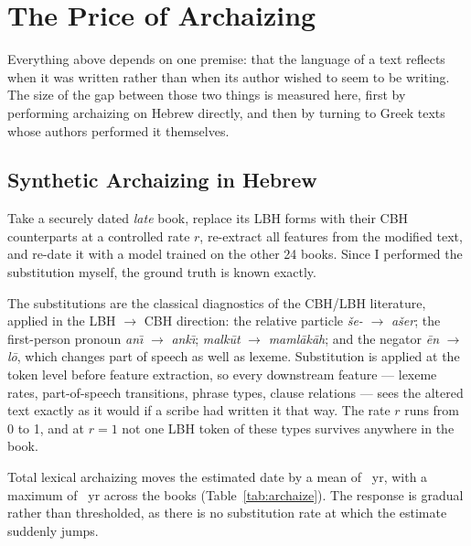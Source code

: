 \documentclass[10pt,letterpaper]{article}
\newcommand{\cbh}{CBH}
\newcommand{\lbh}{LBH}
\begin{document}
\section*{The Price of Archaizing}
\label{sec:archaizing}

Everything above depends on one premise: that the language of a text reflects
when it was written rather than when its author wished to seem to be writing.
The size of the gap between those two things is measured here, first by
performing archaizing on Hebrew directly, and then by turning to Greek texts
whose authors performed it themselves.

\subsection*{Synthetic Archaizing in Hebrew}

Take a securely dated \emph{late} book, replace its \lbh{} forms with their
\cbh{} counterparts at a controlled rate $r$, re-extract all \HBfeat{} features
from the modified text, and re-date it with a model trained on the other 24
books.  Since I performed the substitution myself, the ground
truth is known exactly.

The substitutions are the classical diagnostics of the \cbh{}/\lbh{}
literature, applied in the \lbh{} $\rightarrow$ \cbh{} direction: the relative
particle \textit{še-} $\rightarrow$ \textit{ašer}; the first-person pronoun
\textit{an\={\i}} $\rightarrow$ \textit{ank\={\i}}; \textit{malk\={u}t}
$\rightarrow$ \textit{maml\={a}k\={a}h}; and the negator
\textit{\textquotesingle \={e}n} $\rightarrow$ \textit{l\={o}\textquotesingle},
which changes part of speech as well as lexeme.  Substitution is applied at
the token level before feature extraction, so every downstream feature ---
lexeme rates, part-of-speech transitions, phrase types, clause relations ---
sees the altered text exactly as it would if a scribe had written it that way.
The rate $r$ runs from 0 to 1, and at $r = 1$ not one \lbh{} token of these
types survives anywhere in the book.



Total lexical archaizing moves the estimated date by a mean of \arcMean~yr,
with a maximum of \arcMax~yr across the \arcN{} books (Table~\ref{tab:archaize}).
The response is gradual rather than thresholded, as there is no substitution
rate at which the estimate suddenly jumps.
\end{document}
